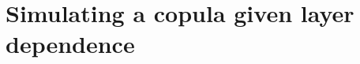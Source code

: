 \documentclass[authoryear]{elsarticle}
\newcommand{\E}{{\mathrm E}}
\newcommand{\de}{\mathrm{d}}
\newcommand{\cq}{\ ,\quad }
\newcommand{\eref}[1]{(\ref{#1})}
\newcommand{\sref}[1]{\S\ref{#1}}
\begin{document}

\section{Simulating a copula given layer dependence}
\end{document}

